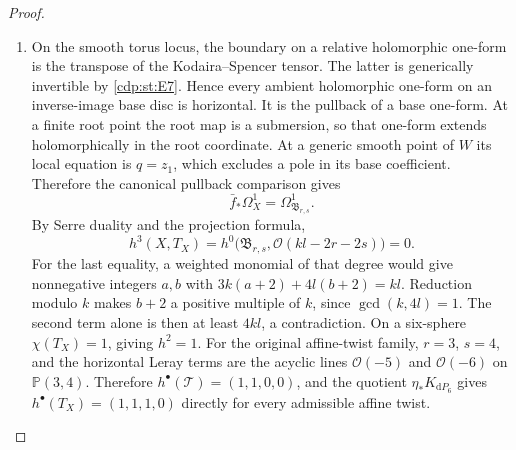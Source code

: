 \begin{proof}
\begin{enumerate}[label=\arabic*.,leftmargin=*]
\item On the smooth torus locus,
the boundary on a relative holomorphic one-form is the transpose
of the Kodaira--Spencer tensor. The latter is generically invertible
by \ref{cdp:st:E7}. Hence every ambient holomorphic one-form on an inverse-image
base disc is horizontal. It is the pullback of a base one-form.
At a finite root point the root map is a submersion, so that
one-form extends holomorphically in the root coordinate. At a
generic smooth point of $W$ its local equation is $q=z_1$, which
excludes a pole in its base coefficient. Therefore the canonical
pullback comparison gives
\[
 \bar f_*\Omega_X^1=\Omega_{\mathfrak B_{r,s}}^1.
\]
By Serre duality and the projection formula,
\[
 h^3(X,T_X)=h^0\bigl(\mathfrak B_{r,s},
                         \mathcal O(kl-2r-2s)\bigr)=0.
\]
For the last equality, a weighted monomial of that degree would
give nonnegative integers $a,b$ with
$3k(a+2)+4l(b+2)=kl$. Reduction modulo $k$ makes $b+2$ a positive
multiple of $k$, since $\gcd(k,4l)=1$. The second term alone
is then at least $4kl$, a contradiction. On a six-sphere
$\chi(T_X)=1$, giving $h^2=1$. For the original affine-twist
family, $r=3$, $s=4$, and the horizontal Leray terms are the
acyclic lines $\mathcal O(-5)$ and $\mathcal O(-6)$ on
$\mathbb P(3,4)$. Therefore $h^\bullet(\mathcal T)=(1,1,0,0)$,
and the quotient $\eta_*K_{\mathrm dP_6}$ gives
$h^\bullet(T_X)=(1,1,1,0)$ directly for every admissible affine
twist.


\end{enumerate}
\end{proof}
